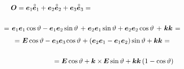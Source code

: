 \begin{figure}[!htbp]
\vspace{-1em}
\begin{multline*}
\shoveleft{ \rotationtensor = \bm{e}_1 \hspace{-0.1ex} \mathcircabove{\bm{e}}_1 + \bm{e}_2 \mathcircabove{\bm{e}}_2 + \bm{e}_3 \mathcircabove{\bm{e}}_3 = \hfill }\\[1.5em]
%
= \hspace{.2ex} \tikzmark{StartBraceE1E1} {\bm{e}_1 \bm{e}_1 \operatorname{cos} \vartheta - \bm{e}_1 \bm{e}_2 \operatorname{sin} \vartheta \hspace{.2em}} \tikzmark{EndBraceE1E1} \hspace{-0.1ex} + \hspace{.1ex} \tikzmark{StartBraceE2E2} {\bm{e}_2 \bm{e}_1 \operatorname{sin} \vartheta + \bm{e}_2 \bm{e}_2 \operatorname{cos} \vartheta \hspace{.2em}} \tikzmark{EndBraceE2E2} \hspace{-0.1ex} + \tikzmark{StartBraceE3E3} {\hspace{.25ex} \bm{k} \bm{k} \hspace{.1ex}} \tikzmark{EndBraceE3E3} \hspace{.1ex}
=\\[0.32em]
%
= \hspace{.1ex} \UnitDyad \operatorname{cos} \vartheta - \hspace{-0.1ex} \tikzmark{StartBraceKk} {\hspace{.1ex}\bm{e}_3 \bm{e}_3\hspace{.1ex}} \tikzmark{EndBraceKk} \hspace{-0.25ex} \operatorname{cos} \vartheta \hspace{.1ex} + \tikzmark{StartBraceSkewsymmetry} {\left( \bm{e}_2 \bm{e}_1 - \bm{e}_1 \bm{e}_2 \right)} \tikzmark{EndBraceSkewsymmetry} \operatorname{sin} \vartheta + \bm{k} \bm{k} \hspace{.1ex}
=\\[1.5em]
%
\shoveright{ \hfill = \UnitDyad \operatorname{cos} \vartheta + \bm{k} \times \hspace{-0.2ex} \UnitDyad \operatorname{sin} \vartheta + \bm{k} \bm{k} \left({1 - \operatorname{cos} \vartheta}\right) }
\end{multline*}


\vspace{-0.5em}
\caption{}\label{fig:eulerfiniterotation}
\end{figure}
